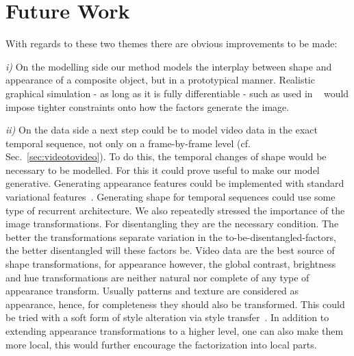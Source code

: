 \section{Future Work}\label{sec:futurework}


	With regards to these two themes there are obvious improvements to be made:


	\emph{i)} On the modelling side our method models the interplay between shape and appearance of a composite object, but in a prototypical manner. Realistic graphical simulation - as long as it is fully differentiable - such as used in ~\cite{kulkarni15dcign, tieleman14thesis} would impose tighter constraints onto how the factors generate the image.

	\emph{ii)} On the data side a next step could be to model video data in the exact temporal sequence, not only on a frame-by-frame level (cf. Sec.~\ref{sec:videotovideo}). To do this, the temporal changes of shape would be necessary to be modelled. For this it could prove useful to make our model generative. Generating appearance features could be implemented with standard variational features~\cite{kingma13vae}. Generating shape for temporal sequences could use some type of recurrent architecture.
	We also repeatedly stressed the importance of the image transformations. For disentangling they are the necessary condition. The better the transformations separate variation in the to-be-disentangled-factors, the better disentangled will these factors be. Video data are the best source of shape transformations, for appearance however, the global contrast, brightness and hue transformations are neither natural nor complete of any type of appearance transform. Usually patterns and texture are considered as appearance, hence, for completeness they should also be transformed. This could be tried with a soft form of style alteration via style transfer~\cite{gatys15neuralstyle}. In addition to extending appearance transformations to a higher level, one can also make them more local, this would further encourage the factorization into local parts.


